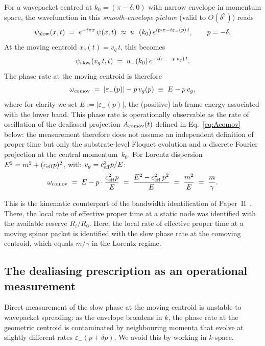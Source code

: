 \documentclass[11pt,a4paper]{article}
\begin{document}
For a wavepacket centred at $k_0 = (\pi - \delta, 0)$ with
narrow envelope in momentum space, the wavefunction in this
\emph{smooth-envelope picture} (valid to $O(\delta^2)$) reads
\begin{equation}
\psi_{\rm slow}(x, t) \;=\; e^{-i\pi x}\, \psi(x, t)
\;\approx\; u_-(k_0)\, e^{i p\cdot x - i \varepsilon_-(p)\, t},
\qquad p = -\delta.
\label{eq:psi_slow}
\end{equation}
At the moving centroid $x_c(t) = v_g\, t$, this becomes
\begin{equation}
\psi_{\rm slow}(v_g\, t, t)
\;=\; u_-(k_0)\, e^{-i (\varepsilon_- - p\,v_g)\, t}.
\label{eq:phi_at_xc}
\end{equation}
The phase rate at the moving centroid is therefore
\begin{equation}
\omega_{\rm comov} \;=\; |\varepsilon_-(p)| - p\,v_g(p)
\;\equiv\; E - p\,v_g,
\label{eq:omega_comov}
\end{equation}
where for clarity we set $E := |\varepsilon_-(p)|$, the
(positive) lab-frame energy associated with the lower band.
This phase rate is operationally observable as the rate of
oscillation of the dealiased projection $A_{\rm comov}(t)$
defined in Eq.~\eqref{eq:Acomov} below: the measurement
therefore does not assume an independent definition of proper
time but only the substrate-level Floquet evolution and a
discrete Fourier projection at the central momentum~$k_0$.
For Lorentz dispersion $E^2 = m^2 + (c_{\rm eff} p)^2$, with
$v_g = c_{\rm eff}^2 p/E$:
\begin{equation}
\omega_{\rm comov}
\;=\; E - p \cdot \frac{c_{\rm eff}^2 p}{E}
\;=\; \frac{E^2 - c_{\rm eff}^2\, p^2}{E}
\;=\; \frac{m^2}{E}
\;=\; \frac{m}{\gamma}.
\label{eq:omega_lorentz}
\end{equation}

This is the kinematic counterpart of the bandwidth
identification of Paper~II~\cite{paperII}. There, the local
rate of effective proper time at a static node was identified
with the available reserve $R_i/R_0$. Here, the local rate of effective proper
time at a moving spinor packet is identified with the slow
phase rate at the comoving centroid, which equals $m/\gamma$ in
the Lorentz regime.

\subsection{The dealiasing prescription as an operational measurement}

Direct measurement of the slow phase at the moving centroid is
unstable to wavepacket spreading: as the envelope broadens in
$k$, the phase rate at the geometric centroid is contaminated
by neighbouring momenta that evolve at slightly different rates
$\varepsilon_-(p+\delta p)$. We avoid this by working in
$k$-space.
\end{document}
